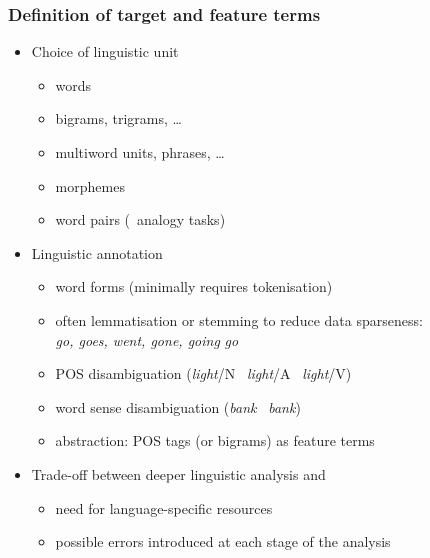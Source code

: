 \documentclass[t]{beamer} %
\begin{document}
\begin{frame}
  \frametitle{Definition of target and feature terms}

  \ungap
  \begin{itemize}
  \item Choice of linguistic unit
    \begin{itemize}
    \item words
    \item bigrams, trigrams, \ldots
    \item multiword units, phrases, \ldots
    \item morphemes
    \item word pairs (\hand\ analogy tasks)
    \end{itemize}
  \item<2-> Linguistic annotation
    \begin{itemize}
    \item word forms (minimally requires tokenisation)
    \item often lemmatisation or stemming to reduce data sparseness:\\
      \emph{go, goes, went, gone, going} \so \emph{go}
    \item POS disambiguation (\emph{light}/N \vs\ \emph{light}/A \vs\ \emph{light}/V)
    \item word sense disambiguation (\emph{bank} \vs\ \emph{bank})
    \item abstraction: POS tags (or bigrams) as feature terms
    \end{itemize}
  \item<3-> Trade-off between deeper linguistic analysis and
    \begin{itemize}
    \item need for language-specific resources
    \item possible errors introduced at each stage of the analysis
    \end{itemize}
  \end{itemize}
\end{frame}
\end{document}
